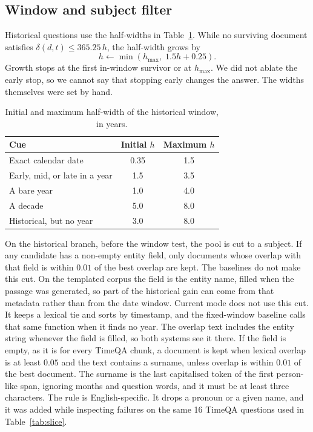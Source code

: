 \documentclass[11pt,letterpaper]{article}
\begin{document}
\subsection{Window and subject filter}

Historical questions use the half-widths in Table~\ref{tab:windows}.
While no surviving document satisfies $\delta(d,t)\le 365.25\,h$, the half-width grows by
\begin{equation}
h \leftarrow \min(h_{\max},\; 1.5h + 0.25).
\label{eq:grow}
\end{equation}
Growth stops at the first in-window survivor or at $h_{\max}$.
We did not ablate the early stop, so we cannot say that stopping early changes the answer.
The widths themselves were set by hand.

\begin{table}[t]
\centering
\caption{Initial and maximum half-width of the historical window, in years.}
\label{tab:windows}
\begin{tabular}{lcc}
\toprule
Cue & Initial $h$ & Maximum $h$ \\
\midrule
Exact calendar date & 0.35 & 1.5 \\
Early, mid, or late in a year & 1.5 & 3.5 \\
A bare year & 1.0 & 4.0 \\
A decade & 5.0 & 8.0 \\
Historical, but no year & 3.0 & 8.0 \\
\bottomrule
\end{tabular}
\end{table}

On the historical branch, before the window test, the pool is cut to a subject.
If any candidate has a non-empty entity field, only documents whose overlap with that field is within $0.01$ of the best overlap are kept.
The baselines do not make this cut.
On the templated corpus the field is the entity name, filled when the passage was generated, so part of the historical gain can come from that metadata rather than from the date window.
Current mode does not use this cut.
It keeps a lexical tie and sorts by timestamp, and the fixed-window baseline calls that same function when it finds no year.
The overlap text includes the entity string whenever the field is filled, so both systems see it there.
If the field is empty, as it is for every TimeQA chunk, a document is kept when lexical overlap is at least $0.05$ and the text contains a surname, unless overlap is within $0.01$ of the best document.
The surname is the last capitalised token of the first person-like span, ignoring months and question words, and it must be at least three characters.
The rule is English-specific.
It drops a pronoun or a given name, and it was added while inspecting failures on the same 16 TimeQA questions used in Table~\ref{tab:slice}.
\end{document}
